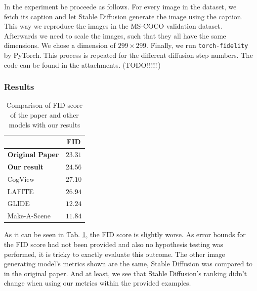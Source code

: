\documentclass[11pt]{article}
\begin{document}
In the experiment be proceede as follows. For every image in the dataset, we fetch its caption and let Stable Diffusion generate the image using the caption. This way we reproduce the images in the MS-COCO validation dataset. Afterwards we need to scale the images, such that they all have the same dimensions. We chose a dimension of $299\times299$. Finally, we run \texttt{torch-fidelity}\cite{obukhov2020torchfidelity} by PyTorch. This process is repeated for the different diffusion step numbers. The code can be found in the attachments. (TODO!!!!!!)

\subsubsection{Results}
\begin{table}[hbp]
    \centering
    \caption{Comparison of FID score of the paper and other models with our results}
    \label{tab:fid_is_comparison}
    \begin{tabular}{lc}
        \toprule
                                                                               & \textbf{FID} \\
        \midrule
        \textbf{Original Paper}                                                & $23.31$      \\
        \textbf{Our result}                                                    & $24.56$      \\\addlinespace
        CogView \cite{ding2021cogviewmasteringtexttoimagegeneration}           & $27.10$      \\
        LAFITE \cite{zhou2022lafitelanguagefreetrainingtexttoimage}            & $26.94$      \\
        GLIDE \cite{rezende2014stochasticbackpropagationapproximateinference}  & $12.24$      \\
        Make-A-Scene \cite{gafni2022makeascenescenebasedtexttoimagegeneration} & $11.84$      \\
        \bottomrule
    \end{tabular}
\end{table}

As it can be seen in Tab. \ref{tab:fid_is_comparison}, the FID score is slightly worse. As error bounds for the FID score had not been provided and also no hypothesis testing was performed, it is tricky to exactly evaluate this outcome. The other image generating model's metrics shown are the same, Stable Diffusion was compared to in the original paper. And at least, we see that Stable Diffusion's ranking didn't change when using our metrics within the provided examples.
\end{document}
